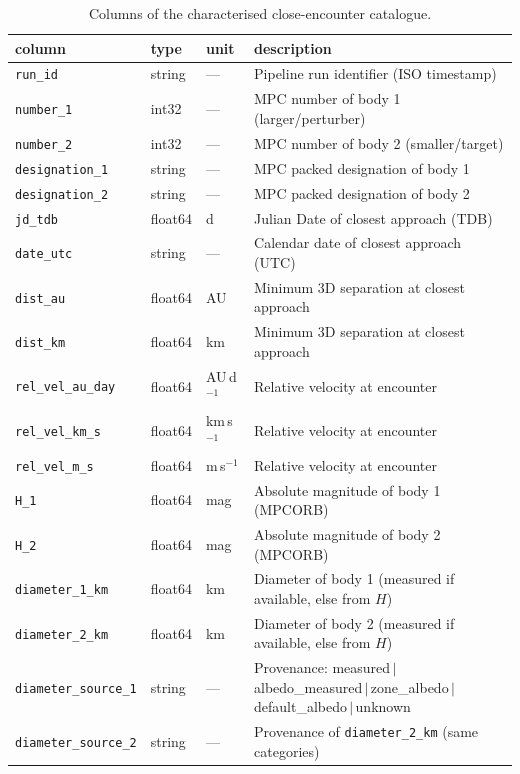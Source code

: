 \documentclass{aa}
\begin{document}
\begin{table}
\caption{Columns of the characterised close-encounter catalogue.}
\label{tab:schema}
\centering
\footnotesize
\begin{tabular}{p{}p{}p{}p{}}
\hline\hline
column & type & unit & description \\
\hline
\texttt{run\_id} & string & --- & Pipeline run identifier (ISO timestamp) \\
\texttt{number\_1} & int32 & --- & MPC number of body 1 (larger/perturber) \\
\texttt{number\_2} & int32 & --- & MPC number of body 2 (smaller/target) \\
\texttt{designation\_1} & string & --- & MPC packed designation of body 1 \\
\texttt{designation\_2} & string & --- & MPC packed designation of body 2 \\
\texttt{jd\_tdb} & float64 & d & Julian Date of closest approach (TDB) \\
\texttt{date\_utc} & string & --- & Calendar date of closest approach (UTC) \\
\texttt{dist\_au} & float64 & AU & Minimum 3D separation at closest approach \\
\texttt{dist\_km} & float64 & km & Minimum 3D separation at closest approach \\
\texttt{rel\_vel\_au\_day} & float64 & AU\,d$^{-1}$ & Relative velocity at encounter \\
\texttt{rel\_vel\_km\_s} & float64 & km\,s$^{-1}$ & Relative velocity at encounter \\
\texttt{rel\_vel\_m\_s} & float64 & m\,s$^{-1}$ & Relative velocity at encounter \\
\texttt{H\_1} & float64 & mag & Absolute magnitude of body 1 (MPCORB) \\
\texttt{H\_2} & float64 & mag & Absolute magnitude of body 2 (MPCORB) \\
\texttt{diameter\_1\_km} & float64 & km & Diameter of body 1 (measured if available, else from $H$) \\
\texttt{diameter\_2\_km} & float64 & km & Diameter of body 2 (measured if available, else from $H$) \\
\texttt{diameter\_source\_1} & string & --- & Provenance: measured\,$\vert$\,albedo\_measured\,$\vert$\,zone\_albedo\,$\vert$\,default\_albedo\,$\vert$\,unknown \\
\texttt{diameter\_source\_2} & string & --- & Provenance of \texttt{diameter\_2\_km} (same categories) \\

\end{tabular}
\end{table}
\end{document}

